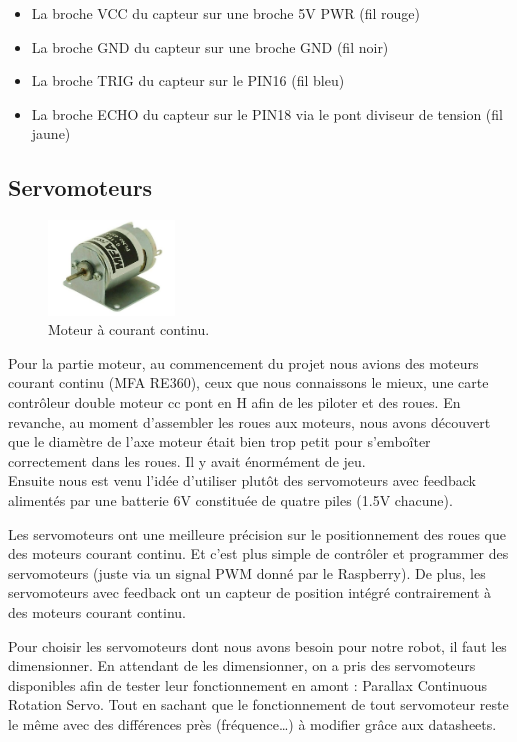 \documentclass[a4paper,12pt]{report}  %
\begin{document}
\begin{itemize}
	\item La broche VCC du capteur sur une broche 5V PWR (fil rouge)
	\item La broche GND du capteur sur une broche GND (fil noir)
	\item La broche TRIG du capteur sur le PIN16 (fil bleu)
	\item La broche ECHO du capteur sur le PIN18 via le pont diviseur de tension (fil jaune) 
\end{itemize}

\subsection{Servomoteurs}

\begin{figure}[H]
	\centering
	\includegraphics[width=0.3\textwidth]{./attachments/moteur_continu.jpg}
	\caption{Moteur à courant continu.}
\end{figure}

Pour la partie moteur, au commencement du projet nous avions des moteurs courant continu (MFA RE360), ceux que nous connaissons le mieux, une carte contrôleur double moteur cc pont en H afin de les piloter et des roues. En revanche, au moment d’assembler les roues aux moteurs, nous avons découvert que le diamètre de l’axe moteur était bien trop petit pour s’emboîter correctement dans les roues. Il y avait énormément de jeu. \\

Ensuite nous est venu l’idée d’utiliser plutôt des servomoteurs avec feedback alimentés par une batterie 6V constituée de quatre piles (1.5V chacune).

Les servomoteurs ont une meilleure précision sur le positionnement des roues que des moteurs courant continu. Et c’est plus simple de contrôler et programmer des servomoteurs (juste via un signal PWM donné par le Raspberry). De plus, les servomoteurs avec feedback ont un capteur de position intégré contrairement à des moteurs courant continu. 

Pour choisir les servomoteurs dont nous avons besoin pour notre robot, il faut les dimensionner. En attendant de les dimensionner, on a pris des servomoteurs disponibles afin de tester leur fonctionnement en amont : Parallax Continuous Rotation Servo. Tout en sachant que le fonctionnement de tout servomoteur reste le même avec des différences près (fréquence…) à modifier grâce aux datasheets. \\
\end{document}
